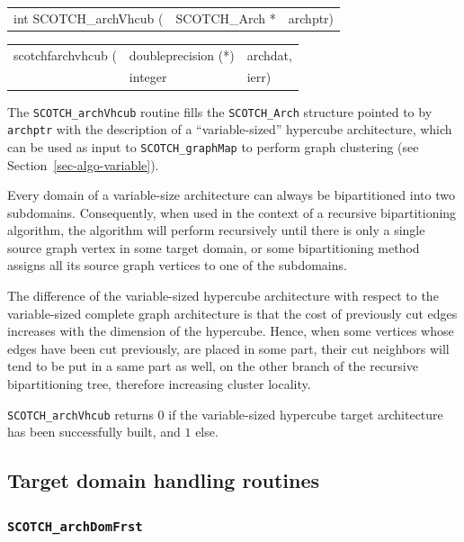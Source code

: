 \begin{itemize}
\progsyn

{\tt\begin{tabular}{l@{}ll}
int SCOTCH\_archVhcub ( & SCOTCH\_Arch * & archptr)
\end{tabular}}

{\tt\begin{tabular}{l@{}ll}
scotchfarchvhcub ( & doubleprecision (*) & archdat, \\
                   & integer             & ierr)
\end{tabular}}

\progdes

The {\tt SCOTCH\_archVhcub} routine fills the {\tt SCOTCH\_\lbt Arch}
structure pointed to by {\tt archptr} with the description of a
``variable-sized'' hypercube architecture, which can be used as
input to {\tt SCOTCH\_\lbt graph\lbt Map} to perform graph clustering
(see Section~\ref{sec-algo-variable}).

Every domain of a variable-size architecture can always be
bipartitioned into two subdomains. Consequently, when used in the
context of a recursive bipartitioning algorithm, the algorithm will
perform recursively until there is only a single source graph vertex
in some target domain, or some bipartitioning method assigns all its
source graph vertices to one of the subdomains.

The difference of the variable-sized hypercube architecture with
respect to the variable-sized complete graph architecture is that the
cost of previously cut edges increases with the dimension of the
hypercube. Hence, when some vertices whose edges have been cut
previously, are placed in some part, their cut neighbors will tend to
be put in a same part as well, on the other branch of the recursive
bipartitioning tree, therefore increasing cluster locality.

\progret

{\tt SCOTCH\_archVhcub} returns $0$ if the variable-sized hypercube
target architecture has been successfully built, and $1$ else.
\end{itemize}

\subsection{Target domain handling routines}
\label{sec-lib-arch-dom-handling}

\subsubsection{{\tt SCOTCH\_archDomFrst}}

